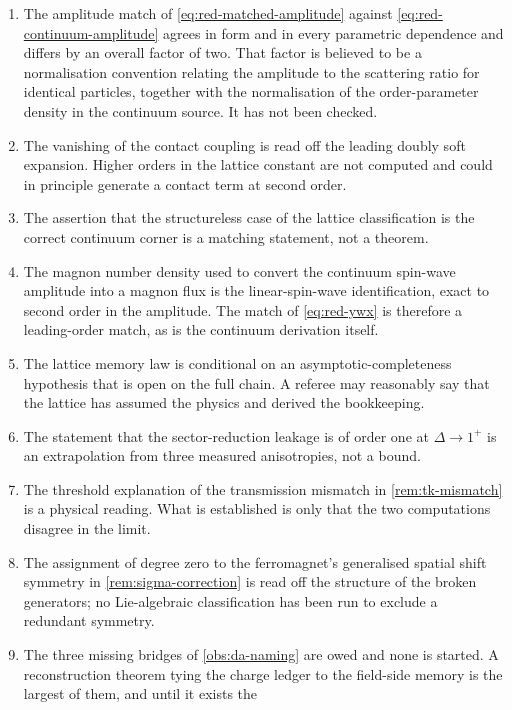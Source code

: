 \begin{enumerate}
\item The amplitude match of \eqref{eq:red-matched-amplitude} against
      \eqref{eq:red-continuum-amplitude} agrees in form and in every parametric
      dependence and differs by an overall factor of two. That factor is
      believed to be a normalisation convention relating the amplitude to the
      scattering ratio for identical particles, together with the normalisation
      of the order-parameter density in the continuum source. It has not been
      checked.
\item The vanishing of the contact coupling is read off the leading doubly soft
      expansion. Higher orders in the lattice constant are not computed and could
      in principle generate a contact term at second order.
\item The assertion that the structureless case of the lattice classification is
      the correct continuum corner is a matching statement, not a theorem.
\item The magnon number density used to convert the continuum spin-wave
      amplitude into a magnon flux is the linear-spin-wave identification, exact
      to second order in the amplitude. The match of \eqref{eq:red-ywx} is
      therefore a leading-order match, as is the continuum derivation itself.
\item The lattice memory law is conditional on an asymptotic-completeness
      hypothesis that is open on the full chain. A referee may reasonably say
      that the lattice has assumed the physics and derived the bookkeeping.
\item The statement that the sector-reduction leakage is of order one at
      $\Delta\to1^+$ is an extrapolation from three measured anisotropies, not a
      bound.
\item The threshold explanation of the transmission mismatch in
      \cref{rem:tk-mismatch} is a physical reading. What is established is only
      that the two computations disagree in the limit.
\item The assignment of degree zero to the ferromagnet's generalised spatial
      shift symmetry in \cref{rem:sigma-correction} is read off the structure of
      the broken generators; no Lie-algebraic classification has been run to
      exclude a redundant symmetry.
\item The three missing bridges of \cref{obs:da-naming} are owed and none is
      started. A reconstruction theorem tying the charge ledger to the
      field-side memory is the largest of them, and until it exists the

\end{enumerate}
